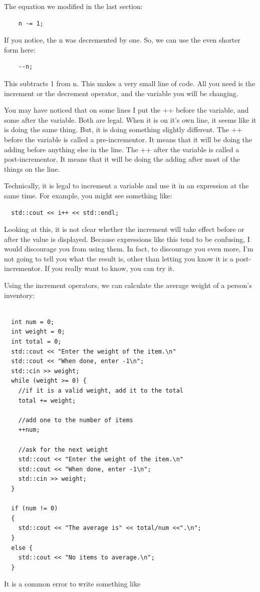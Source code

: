 The equation we modified in the last section:
\begin{verbatim}
    n -= 1;
\end{verbatim}

If you notice, the n was decremented by one. So, we can use the even shorter form here:
\begin{verbatim}
    --n;
\end{verbatim}
This subtracts 1 from n. This makes a very small line of code. All you need is the increment or the decrement operator, and the variable you will be changing.

You may have noticed that on some lines I put the ++ before the variable, and some after the variable. Both are legal. When it is on it's own line, it seems like it is doing the same thing. But, it is doing something slightly different. The ++ before the variable is called a pre-incrementor. It means that it will be doing the adding before anything else in the line. The ++ after the variable is called a post-incrementor. It means that it will be doing the adding after most of the things on the line. 

Technically, it is legal to increment a variable and use it
in an expression at the same time.  For example, you might see
something like:

\begin{verbatim}
  std::cout << i++ << std::endl;
\end{verbatim}
%
Looking at this, it is not clear whether the increment will
take effect before or after the value is displayed.  Because
expressions like this tend to be confusing, I would discourage
you from using them.  In fact, to discourage you even more,
I'm not going to tell you what the result is, other than letting you know it is a post-incrementor.  If you really
want to know, you can try it.

Using the increment operators, we can calculate the average weight of a person's inventory:

\begin{lstlisting}
  
  int num = 0;
  int weight = 0;
  int total = 0;
  std::cout << "Enter the weight of the item.\n"
  std::cout << "When done, enter -1\n";
  std::cin >> weight;
  while (weight >= 0) {
    //if it is a valid weight, add it to the total
    total += weight;
    
    //add one to the number of items
    ++num;
    
    //ask for the next weight
    std::cout << "Enter the weight of the item.\n"
    std::cout << "When done, enter -1\n";
    std::cin >> weight;    
  }
  
  if (num != 0)
  {
    std::cout << "The average is" << total/num <<".\n"; 
  }
  else {
    std::cout << "No items to average.\n";
  }
\end{lstlisting}
%
It is a common error to write something like


